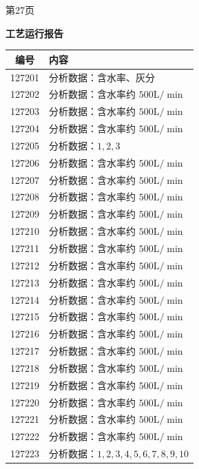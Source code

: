 \documentclass[UTF8,10pt,a4paper,fontset=fandol]{ctexart}
\begin{document}
\begin{center}
\begin{minipage}[t]{0.47\textwidth}
\smallskip
第27页
\end{minipage}
\hfill
\begin{minipage}[t]{0.47\textwidth}
\centering
\textbf{工艺运行报告}

\smallskip
\begin{tabularx}{\linewidth}{|c|X|}
\hline
\textbf{编号} & \textbf{内容} \\ \hline
127201 & 分析数据：含水率、灰分 \\ \hline
127202 & 分析数据：含水率约 $500\mathrm{L}/\min$ \\ \hline
127203 & 分析数据：含水率约 $500\mathrm{L}/\min$ \\ \hline
127204 & 分析数据：含水率约 $500\mathrm{L}/\min$ \\ \hline
127205 & 分析数据：$1,2,3$ \\ \hline
127206 & 分析数据：含水率约 $500\mathrm{L}/\min$ \\ \hline
127207 & 分析数据：含水率约 $500\mathrm{L}/\min$ \\ \hline
127208 & 分析数据：含水率约 $500\mathrm{L}/\min$ \\ \hline
127209 & 分析数据：含水率约 $500\mathrm{L}/\min$ \\ \hline
127210 & 分析数据：含水率约 $500\mathrm{L}/\min$ \\ \hline
127211 & 分析数据：含水率约 $500\mathrm{L}/\min$ \\ \hline
127212 & 分析数据：含水率约 $500\mathrm{L}/\min$ \\ \hline
127213 & 分析数据：含水率约 $500\mathrm{L}/\min$ \\ \hline
127214 & 分析数据：含水率约 $500\mathrm{L}/\min$ \\ \hline
127215 & 分析数据：含水率约 $500\mathrm{L}/\min$ \\ \hline
127216 & 分析数据：含水率约 $500\mathrm{L}/\min$ \\ \hline
127217 & 分析数据：含水率约 $500\mathrm{L}/\min$ \\ \hline
127218 & 分析数据：含水率约 $500\mathrm{L}/\min$ \\ \hline
127219 & 分析数据：含水率约 $500\mathrm{L}/\min$ \\ \hline
127220 & 分析数据：含水率约 $500\mathrm{L}/\min$ \\ \hline
127221 & 分析数据：含水率约 $500\mathrm{L}/\min$ \\ \hline
127222 & 分析数据：含水率约 $500\mathrm{L}/\min$ \\ \hline
127223 & 分析数据：$1,2,3,4,5,6,7,8,9,10$ \\ \hline

\end{tabularx}
\end{minipage}
\end{center}
\end{document}
